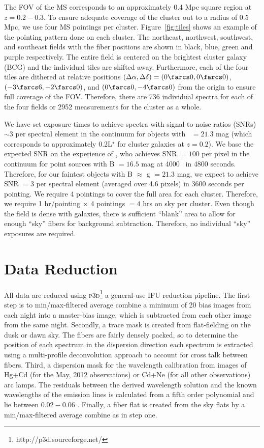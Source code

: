 The FOV of the MS corresponds to an approximately 0.4 Mpc square region at $z = 0.2-0.3$. To ensure adequate coverage of the cluster out to a radius of 0.5 Mpc, we use four MS pointings per cluster. Figure~\ref{fig:tiles} shows an example of the pointing pattern done on each cluster. The northeast, northwest, southwest, and southeast fields with the fiber positions are shown in black, blue, green and purple respectively. The entire field is centered on the brightest cluster galaxy (BCG) and the individual tiles are shifted away. Furthermore, each of the four tiles are dithered at relative positions $(\Delta \alpha, \Delta \delta)=(0\farcs0,0\farcs0)$, $(-3\farcs6,-2\farcs0)$, and $(0\farcs0, -4\farcs0)$ from the origin to ensure full coverage of the FOV. Therefore, there are 736 individual spectra for each of the four fields or 2952 measurements for the cluster as a whole.

We have set exposure times to achieve spectra with signal-to-noise ratios (SNRs) $\sim3$ per spectral element in the continuum for objects with \sdssg\ $= 21.3$ mag (which corresponds to approximately 0.2L$^\star$ for cluster galaxies at $z = 0.2$). We base the expected SNR on the experience of \cite{Shetrone2010}, who achieves SNR $= 100$ per pixel in the continuum for point sources with B $=16.5$ mag at 4000 \AAA\ in 4800 seconds. Therefore, for our faintest objects with B $\approx$ g $= 21.3$ mag, we expect to achieve SNR $= 3$ per spectral element (averaged over 4.6 pixels) in 3600 seconds per pointing. We require 4 pointings to cover the full area for each cluster. Therefore, we require 1 hr/pointing $\times$ 4 pointings $= 4$ hrs on sky per cluster. Even though the field is dense with galaxies, there is sufficient ``blank'' area to allow for enough ``sky'' fibers for background subtraction. Therefore, no individual ``sky'' exposures are required.

\section{Data Reduction}\label{sec:data reduction} 
All data are reduced using \textsc{p3d}\footnote{http://p3d.sourceforge.net/} \citep{Sandin2010} a general-use IFU reduction pipeline. The first step is to min/max-filtered average combine a minimum of 20 bias images from each night into a master-bias image, which is subtracted from each other image from the same night. Secondly, a trace mask is created from flat-fielding on the dusk or dawn sky. The fibers are fairly densely packed, so to determine the position of each spectrum in the dispersion direction each spectrum is extracted using a multi-profile deconvolution approach \citep{Sharp2010} to account for cross talk between fibers. Third, a dispersion mask for the wavelength calibration from images of Hg+Cd (for the May, 2012 observations) or Cd+Ne (for all other observations) arc lamps. The residuals between the derived wavelength solution and the known wavelengths of the emission lines is calculated from a fifth order polynomial and lie between $0.02 - 0.06$ \AAA. Finally, a fiber flat is created from the sky flats by a min/max-filtered average combine as in step one. 

